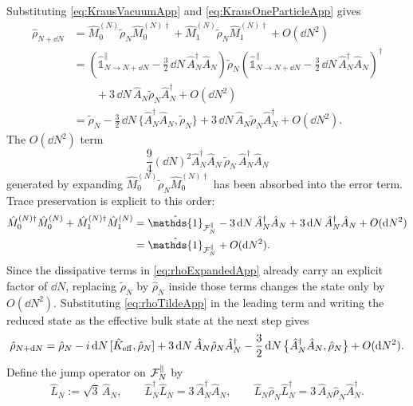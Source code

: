 \documentclass{article}
\def\cF{{\cal F}}
\newcommand{\openone}{\hat{\mathds{1}}}
\numberwithin{equation}{section}
\begin{document}
	Substituting \cref{eq:KrausVacuumApp} and \cref{eq:KrausOneParticleApp} gives
	\begin{align}
		\hat\rho_{N+\dd N}
		&= \hat M_0^{(N)} \tilde{\rho}_N \hat M_0^{(N)\dagger}
		+ \hat M_1^{(N)} \tilde{\rho}_N \hat M_1^{(N)\dagger}
		+ O(\dd N^2) \nonumber\\
		&= \left( \openone^\parallel_{N\to N+\dd N} - \frac32\,\dd N\,\hat A_N^\dagger\hat A_N \right)
		\tilde{\rho}_N
		\left( \openone^\parallel_{N\to N+\dd N} - \frac32\,\dd N\,\hat A_N^\dagger\hat A_N \right)^\dagger
		\nonumber\\
		&\hspace{2em} + 3\,\dd N\, \hat A_N\tilde{\rho}_N\hat A_N^\dagger
		+ O(\dd N^2) \nonumber\\
		&= \tilde{\rho}_N - \frac32\,\dd N\, \bigl\{ \hat A_N^\dagger\hat A_N,\tilde{\rho}_N \bigr\}
		+ 3\,\dd N\, \hat A_N\tilde{\rho}_N\hat A_N^\dagger
		+ O(\dd N^2).
		\label{eq:rhoExpandedApp}
	\end{align}
	The \(O(\dd N^2)\) term \[ \frac94(\dd N)^2 \hat A_N^\dagger\hat A_N\, \tilde{\rho}_N\, \hat A_N^\dagger\hat A_N \] generated by expanding \(\hat M_0^{(N)}\tilde{\rho}_N\hat M_0^{(N)\dagger}\) has been absorbed into the error term. Trace preservation is explicit to this order:
	\begin{align}
		\hat M_0^{(N)\dagger}\hat M_0^{(N)} + \hat M_1^{(N)\dagger}\hat M_1^{(N)} &= \openone_{\cF_N^\parallel} - 3\,\dd N\,\hat A_N^\dagger\hat A_N + 3\,\dd N\,\hat A_N^\dagger\hat A_N + O(\dd N^2) \nonumber\\ &= \openone_{\cF_N^\parallel} + O(\dd N^2).
		\label{eq:traceCheckApp}
	\end{align}
	Since the dissipative terms in \cref{eq:rhoExpandedApp} already carry an explicit factor of \(\dd N\), replacing \(\tilde{\rho}_N\) by \(\hat\rho_N\) inside those terms changes the state only by \(O(\dd N^2)\). Substituting \cref{eq:rhoTildeApp} in the leading term and writing the reduced state as the effective bulk state at the next step gives
	\begin{equation}
		\hat\rho_{N+\dd N} = \hat\rho_N - i\,\dd N\,[\hat K_{\rm eff},\hat\rho_N] + 3\,\dd N\,\hat A_N\hat\rho_N\hat A_N^\dagger - \frac32\,\dd N\, \bigl\{ \hat A_N^\dagger\hat A_N,\hat\rho_N \bigr\} + O(\dd N^2).
		\label{eq:rhoStepATracingApp}
	\end{equation}
	Define the jump operator on \(\cF_N^\parallel\) by
	\begin{equation}
		\hat L_N := \sqrt3\,\hat A_N, \qquad \hat L_N^\dagger\hat L_N = 3\,\hat A_N^\dagger\hat A_N, \qquad \hat L_N\hat\rho_N\hat L_N^\dagger = 3\,\hat A_N\hat\rho_N\hat A_N^\dagger .
		\label{eq:LdefTracingApp}
	\end{equation}
\end{document}
